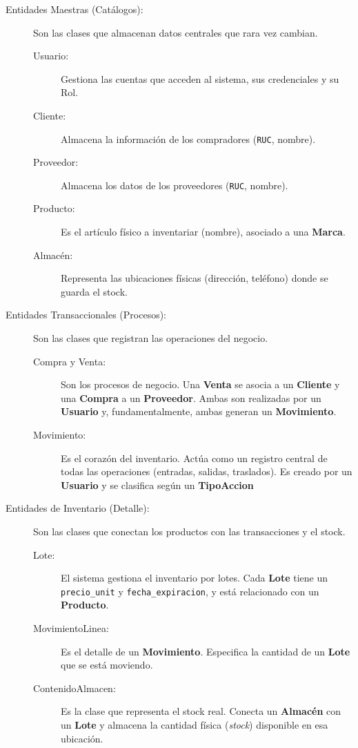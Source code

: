 \documentclass[12pt]{article} %
\begin{document}
\begin{description}

  \item[Entidades Maestras (Catálogos):] Son las clases que almacenan datos centrales que rara vez cambian.
    \begin{description}
      \item[Usuario:] Gestiona las cuentas que acceden al sistema, sus credenciales y su Rol.

      \item[Cliente:] Almacena la información de los compradores (\texttt{RUC}, nombre).

      \item[Proveedor:] Almacena los datos de los proveedores (\texttt{RUC}, nombre).

      \item[Producto:] Es el artículo físico a inventariar (nombre), asociado a una \textbf{Marca}.

      \item[Almacén:] Representa las ubicaciones físicas (dirección, teléfono) donde se guarda el stock.
    \end{description}

  \item[Entidades Transaccionales (Procesos):] Son las clases que registran las operaciones del negocio.
    \begin{description}
      \item[Compra y Venta:] Son los procesos de negocio. Una \textbf{Venta} se asocia a un \textbf{Cliente} y una \textbf{Compra} a un \textbf{Proveedor}. Ambas son realizadas por un \textbf{Usuario} y, fundamentalmente, ambas generan un \textbf{Movimiento}.

      \item[Movimiento:] Es el corazón del inventario. Actúa como un registro central de todas las operaciones (entradas, salidas, traslados). Es creado por un \textbf{Usuario} y se clasifica según un \textbf{TipoAccion} %
    \end{description}

  \item[Entidades de Inventario (Detalle):] Son las clases que conectan los productos con las transacciones y el stock.
    \begin{description}
      \item[Lote:] El sistema gestiona el inventario por lotes. Cada \textbf{Lote} tiene un \texttt{precio\_unit} y \texttt{fecha\_expiracion}, y está relacionado con un \textbf{Producto}.

      \item[MovimientoLinea:] Es el detalle de un \textbf{Movimiento}. Especifica la cantidad de un \textbf{Lote} que se está moviendo.

      \item[ContenidoAlmacen:] Es la clase que representa el stock real. Conecta un \textbf{Almacén} con un \textbf{Lote} y almacena la cantidad física (\textit{stock}) disponible en esa ubicación.
    \end{description}

\end{description}
\end{document}
